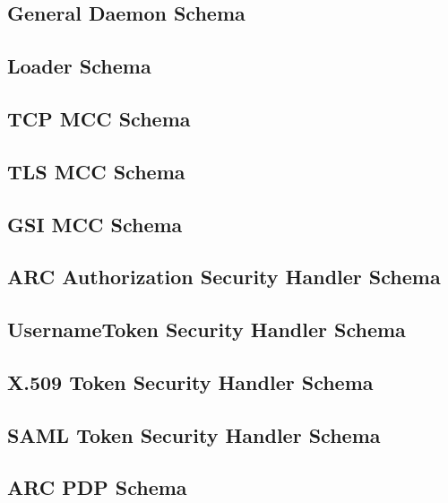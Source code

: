 \documentclass{article}
\begin{document}
\subsection{General Daemon Schema}


\subsection{Loader Schema}


\subsection{TCP MCC Schema}


\subsection{TLS MCC Schema}


\subsection{GSI MCC Schema}


\subsection{ARC Authorization Security Handler Schema}


\subsection{UsernameToken Security Handler Schema}


\subsection{X.509 Token Security Handler Schema}


\subsection{SAML Token Security Handler Schema}


\subsection{ARC PDP Schema}

\end{document}
